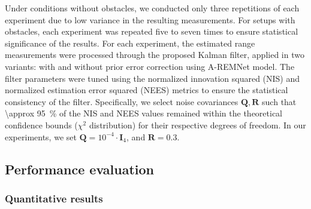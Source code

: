 


Under conditions without obstacles, we conducted only three repetitions of each experiment due to low variance in the resulting measurements. For setups with obstacles, each experiment was repeated five to seven times to ensure statistical significance of the results. For each experiment, the estimated range measurements were processed through the proposed Kalman filter, applied in two variants: with and without prior error correction using A-REMNet model. The filter parameters were tuned using the normalized innovation squared (NIS) and normalized estimation error squared (NEES) metrics to ensure the statistical consistency of the filter. Specifically, we select noise covariances $\mathbf{Q}, \mathbf{R}$ such that \SI{\approx 95}{\percent} of the NIS and NEES values remained within the theoretical confidence bounds ($\chi^2$ distribution) for their respective degrees of freedom. In our experiments, we set $\mathbf{Q} = 10^{-4} \cdot \mathbf{I}_4$, and $\mathbf{R} = 0.3$.

\subsection{Performance evaluation}
\subsubsection{Quantitative results}

